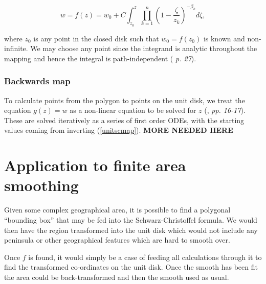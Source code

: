 \documentclass[a4paper,10pt]{amsart}
\newcommand{\sch}{Schwarz-Christoffel }
\begin{document}
\begin{equation}
\label{unitscmap}
w=f(z) = w_0 + C \int_{z_0}^{z} \prod_{k=1}^{n} (1 - \frac{\zeta}{z_k})^{-\beta_k} d\zeta,
\end{equation}

where $z_0$ is any point in the closed disk such that $w_0 = f(z_0)$ is known and non-infinite. We may choose any point since the integrand is analytic throughout the mapping and hence the integral is path-independent (\cite{driscoll} \emph{p. 27}).


\subsubsection{Backwards map}

To calculate points from the polygon to points on the unit disk, we treat the equation $g(z)=w$ as a non-linear equation to be solved for $z$ (\cite{trefethen}, \emph{pp. 16-17}). These are solved iteratively as a series of first order ODEs, with the starting values coming from inverting (\ref{unitscmap}).
\textbf{MORE NEEDED HERE}


\section{Application to finite area smoothing}

Given some complex geographical area, it is possible to find a polygonal ``bounding box'' that may be fed into the \sch formula. We would then have the region transformed into the  unit disk which would not include any peninsula or other geographical features which are hard to smooth over.

Once $f$ is found, it would simply be a case of feeding all calculations through it to find the transformed co-ordinates on the unit disk. Once the smooth has been fit the area could be back-transformed and then the smooth used as usual.





\end{document}
